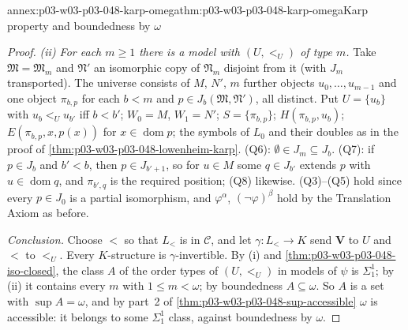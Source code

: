 \begin{annexitem}{annex:p03-w03-p03-048-karp-omega}{thm:p03-w03-p03-048-karp-omega}{Karp property and boundedness by \(\omega\)}
\begin{proof}
\emph{(ii) For each \(m\geq1\) there is a model with \((U,<_U)\) of type
\(m\).}  Take \(\mathfrak M=\mathfrak M_m\) and \(\mathfrak N'\) an
isomorphic copy of \(\mathfrak N_m\) disjoint from it (with \(J_m\)
transported).  The universe consists of \(M\), \(N'\), \(m\) further objects
\(u_0,\ldots,u_{m-1}\) and one object \(\pi_{b,p}\) for each \(b<m\) and
\(p\in J_b(\mathfrak M,\mathfrak N')\), all distinct.  Put
\(U=\{u_b\}\) with \(u_b<_Uu_{b'}\) iff \(b<b'\); \(W_0=M\), \(W_1=N'\);
\(S=\{\pi_{b,p}\}\); \(H(\pi_{b,p},u_b)\); \(E(\pi_{b,p},x,p(x))\) for
\(x\in\operatorname{dom}p\); the symbols of \(L_0\) and their doubles as in
the proof of \cref{thm:p03-w03-p03-048-lowenheim-karp}.  (Q6): \(\emptyset\in
J_m\subseteq J_b\).  (Q7): if \(p\in J_b\) and \(b'<b\), then \(p\in
J_{b'+1}\), so for \(u\in M\) some \(q\in J_{b'}\) extends \(p\) with \(u\in
\operatorname{dom}q\), and \(\pi_{b',q}\) is the required position; (Q8)
likewise.  (Q3)--(Q5) hold since every \(p\in J_0\) is a partial
isomorphism, and \(\varphi^{\alpha}\), \((\neg\varphi)^{\beta}\) hold by
the Translation Axiom as before.

\emph{Conclusion.}  Choose \(<\) so that \(L_{<}\) is in \(\mathcal C\), and
let \(\gamma:L_{<}\to K\) send \(\mathbf V\) to \(U\) and \(<\) to \(<_U\).
Every \(K\)-structure is \(\gamma\)-invertible.  By (i) and
\cref{thm:p03-w03-p03-048-iso-closed}, the class \(A\) of the order types of
\((U,<_U)\) in models of \(\psi\) is \(\Sigma^1_1\); by (ii) it contains
every \(m\) with \(1\leq m<\omega\); by boundedness \(A\subseteq\omega\).  So
\(A\) is a set with \(\sup A=\omega\), and by part~2 of
\cref{thm:p03-w03-p03-048-sup-accessible} \(\omega\) is accessible: it
belongs to some \(\Sigma^1_1\) class, against boundedness by \(\omega\).
\end{proof}
\end{annexitem}

